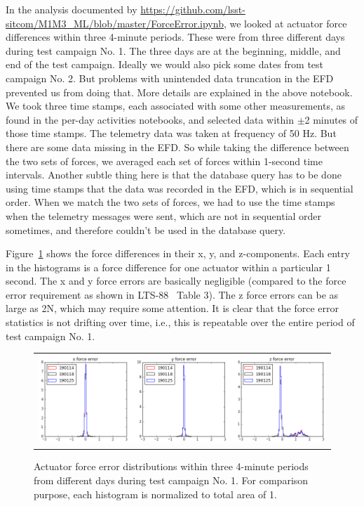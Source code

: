 \documentclass [twoside,openbib,12pt]{article}
\begin{document}
In the analysis documented by
\url{https://github.com/lsst-sitcom/M1M3_ML/blob/master/ForceError.ipynb},
we looked at actuator force differences within three 4-minute
periods. These were from three different days during test campaign
No. 1.
The three days are at the beginning, middle, and end of the test
campaign.
Ideally we would also pick some dates from test campaign No. 2. But
problems with unintended data truncation in the EFD prevented us from
doing that. More details are explained in the above notebook.
We took three time stamps, each associated with some other
measurements, as found in the per-day activities notebooks, and
selected data within $\pm$2 minutes of those time stamps.
The telemetry data was taken at frequency of 50 Hz. But there are some
data missing in the EFD. So while taking the difference between the
two sets of forces, we averaged each set of forces within 1-second time intervals.
Another subtle thing here is that the database query has to be done
using time stamps that the data was recorded in the EFD, which is in
sequential order. When we match the two sets of forces, we had to use
the time stamps when the telemetry messages were sent, which are not
in sequential order sometimes, and therefore couldn't be used in the
database query.

Figure~\ref{fig:forceError} shows the force differences in their x, y,
and z-components. Each entry in the histograms is a force difference
for one actuator within a particular 1 second.
The x and y force errors are basically negligible (compared to the
force error requirement as shown in LTS-88~\cite{lts88} Table 3).
The z force errors can be as large as 2N, which may require some attention.
It is clear that the force error statistics is not drifting over time, i.e.,
this is repeatable over the entire period of test campaign No. 1.

 \begin{figure}[bthp]
   \begin{center}
     \begin{tabular}{c}
\includegraphics[width=170mm]{figures/forceError.png}
  \end{tabular}
   \end{center}
   \caption
   { \label{fig:forceError}
Actuator force error distributions within three 4-minute periods from
different days during test campaign No. 1. For comparison purpose, each histogram is
normalized to total area of 1.
 }
\end{figure}
\end{document}
